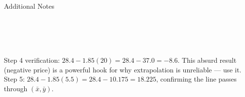 \documentclass[10pt]{article}
\begin{document}
\begin{notesbox}{Additional Notes}
\vspace{0pt}
\writeline\\\writeline\\\writeline\\\writeline\\\writeline\\\writeline
\end{notesbox}

\begin{teachernote}
Step 4 verification: $28.4 - 1.85(20) = 28.4 - 37.0 = -8.6$. This absurd result (negative price)
is a powerful hook for why extrapolation is unreliable --- use it. Step 5: $28.4 - 1.85(5.5)
= 28.4 - 10.175 = 18.225$, confirming the line passes through $(\bar{x}, \bar{y})$.
\end{teachernote}
\end{document}
